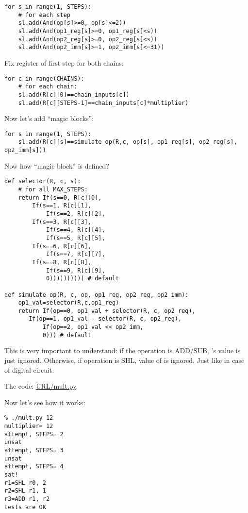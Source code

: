 \begin{lstlisting}
for s in range(1, STEPS):
    # for each step
    sl.add(And(op[s]>=0, op[s]<=2))
    sl.add(And(op1_reg[s]>=0, op1_reg[s]<s))
    sl.add(And(op2_reg[s]>=0, op2_reg[s]<s))
    sl.add(And(op2_imm[s]>=1, op2_imm[s]<=31))
\end{lstlisting}

Fix register of first step for both chains:

\begin{lstlisting}
for c in range(CHAINS):
    # for each chain:
    sl.add(R[c][0]==chain_inputs[c])
    sl.add(R[c][STEPS-1]==chain_inputs[c]*multiplier)
\end{lstlisting}

Now let's add ``magic blocks'':

\begin{lstlisting}
for s in range(1, STEPS):
    sl.add(R[c][s]==simulate_op(R,c, op[s], op1_reg[s], op2_reg[s], op2_imm[s]))
\end{lstlisting}

Now how ``magic block'' is defined?

\begin{lstlisting}
def selector(R, c, s):
    # for all MAX_STEPS:
    return If(s==0, R[c][0],
	    If(s==1, R[c][1],
            If(s==2, R[c][2],
	    If(s==3, R[c][3],
            If(s==4, R[c][4],
            If(s==5, R[c][5],
	    If(s==6, R[c][6],
            If(s==7, R[c][7],
	    If(s==8, R[c][8],
            If(s==9, R[c][9],
	        0)))))))))) # default

def simulate_op(R, c, op, op1_reg, op2_reg, op2_imm):
    op1_val=selector(R,c,op1_reg)
    return If(op==0, op1_val + selector(R, c, op2_reg),
	   If(op==1, op1_val - selector(R, c, op2_reg),
           If(op==2, op1_val << op2_imm,
	       0))) # default
\end{lstlisting}

This is very important to understand: if the operation is ADD/SUB, 's value is just ignored.
Otherwise, if operation is SHL, value of  is ignored.
Just like in case of digital circuit.

The code: \url{URL/mult.py}.

Now let's see how it works:

\begin{lstlisting}
% ./mult.py 12
multiplier= 12
attempt, STEPS= 2
unsat
attempt, STEPS= 3
unsat
attempt, STEPS= 4
sat!
r1=SHL r0, 2
r2=SHL r1, 1
r3=ADD r1, r2
tests are OK
\end{lstlisting}

